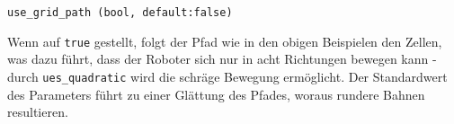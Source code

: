 \lstinline{use_grid_path (bool, default:false)}{}

Wenn auf \lstinline{true}{} gestellt, folgt der Pfad wie in den obigen Beispielen den Zellen, was dazu führt, dass der Roboter sich nur in acht Richtungen bewegen kann - durch \lstinline{ues_quadratic}{} wird die schräge Bewegung ermöglicht. Der Standardwert des Parameters führt zu einer Glättung des Pfades, woraus rundere Bahnen resultieren.

